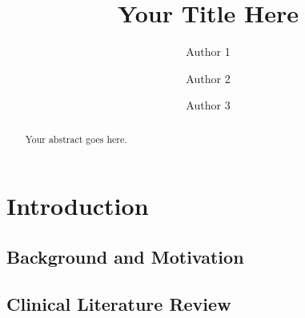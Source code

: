 \documentclass[12pt]{article}
\title{Your Title Here}
\author{Author 1 \and Author 2 \and Author 3}
\date{} %
\begin{document}
\maketitle

\begin{abstract}
    Your abstract goes here.
\end{abstract}

\section{Introduction}
\label{sec:introduction}

\subsection{Background and Motivation}
\label{subsec:intro_Background}







\subsection{Clinical Literature Review}
\label{subsec:intro_clinical}





\end{document}
